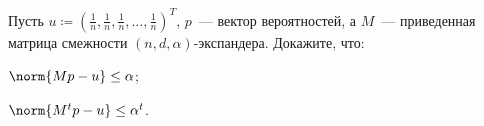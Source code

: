 Пусть $u \coloneqq \left(\frac{1}{n}, \frac{1}{n}, \frac{1}{n}, \dots, \frac{1}{n}\right)^{T}$, $p$~---
вектор вероятностей, а $M$~--- приведенная матрица смежности $(n, d, \alpha)$-экспандера. Докажите, что:
\begin{enumcyr}
    \item $\norm{M p - u} \le \alpha$;
    \item $\norm{M^t p - u} \le \alpha^t$.
\end{enumcyr}